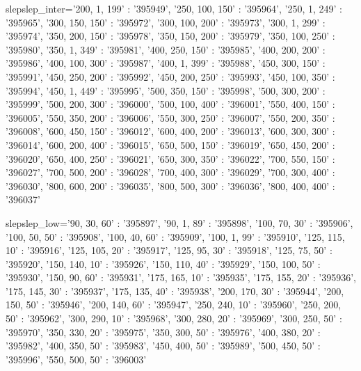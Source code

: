 slepslep_inter={'200, 1, 199' : '395949',
                '250, 100, 150' : '395964',
                '250, 1, 249' : '395965',
                '300, 150, 150' : '395972',
                '300, 100, 200' : '395973',
                '300, 1, 299' : '395974',
                '350, 200, 150' : '395978',
                '350, 150, 200' : '395979',
                '350, 100, 250' : '395980',
                '350, 1, 349' : '395981',
                '400, 250, 150' : '395985',
                '400, 200, 200' : '395986',
                '400, 100, 300' : '395987',
                '400, 1, 399' : '395988',
                '450, 300, 150' : '395991',
                '450, 250, 200' : '395992',
                '450, 200, 250' : '395993',
                '450, 100, 350' : '395994',
                '450, 1, 449' : '395995',
                '500, 350, 150' : '395998',
                '500, 300, 200' : '395999',
                '500, 200, 300' : '396000',
                '500, 100, 400' : '396001',
                '550, 400, 150' : '396005',
                '550, 350, 200' : '396006',
                '550, 300, 250' : '396007',
                '550, 200, 350' : '396008',
                '600, 450, 150' : '396012',
                '600, 400, 200' : '396013',
                '600, 300, 300' : '396014',
                '600, 200, 400' : '396015',
                '650, 500, 150' : '396019',
                '650, 450, 200' : '396020',
                '650, 400, 250' : '396021',
                '650, 300, 350' : '396022',
                '700, 550, 150' : '396027',
                '700, 500, 200' : '396028',
                '700, 400, 300' : '396029',
                '700, 300, 400' : '396030',
                '800, 600, 200' : '396035',
                '800, 500, 300' : '396036',
                '800, 400, 400' : '396037'}















slepslep_low={'90, 30, 60' : '395897',
              '90, 1, 89' : '395898',
              '100, 70, 30' : '395906',
              '100, 50, 50' : '395908',
    '100, 40, 60' : '395909',
    '100, 1, 99' : '395910',
    '125, 115, 10' : '395916',
    '125, 105, 20' : '395917',
    '125, 95, 30' : '395918',
    '125, 75, 50' : '395920',
    '150, 140, 10' : '395926',
    '150, 110, 40' : '395929',
    '150, 100, 50' : '395930',
    '150, 90, 60' : '395931',
    '175, 165, 10' : '395935',
    '175, 155, 20' : '395936',
    '175, 145, 30' : '395937',
    '175, 135, 40' : '395938',
    '200, 170, 30' : '395944',
    '200, 150, 50' : '395946',
    '200, 140, 60' : '395947',
    '250, 240, 10' : '395960',
    '250, 200, 50' : '395962',
    '300, 290, 10' : '395968',
    '300, 280, 20' : '395969',
    '300, 250, 50' : '395970',
    '350, 330, 20' : '395975',
    '350, 300, 50' : '395976',
    '400, 380, 20' : '395982',
    '400, 350, 50' : '395983',
    '450, 400, 50' : '395989',
    '500, 450, 50' : '395996',
    '550, 500, 50' : '396003'}
    
